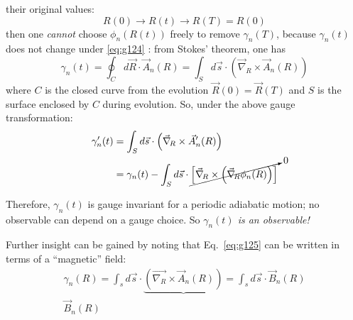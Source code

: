 \documentclass[12pt]{article}
\newcommand{\be}{\begin{equation}}
\newcommand{\ee}{\end{equation}}
\begin{document}
\begin{enumerate}
their original values:
\be
R(0) \rightarrow R(t) \rightarrow R(T)=R(0)
\label{eq:g124}
\ee
then one \emph{cannot} choose $\phi_{n}(R(t))$ freely to
remove $\gamma_{n}(T)$, because $\gamma_{n}(t)$ does not change
under \eqref{eq:g124} : from Stokes' theorem, one has
\be
\gamma_{n}(t)=\oint_{C} d \vec{R} \cdot \vec{A}_{n}(R)=\int_{S} d \vec{s} \cdot\left(\vec{\nabla}_{\!R}  \times \vec{A}_{n}(R)\right)
\label{eq:g125}
\ee
where 
$C$ is the closed curve from the
evolution $\vec{R}(0)=\vec{R}(T)$
and
$S$ is the surface enclosed
by $C$ during evolution.
So, under the above gauge transformation:
\be
\begin{aligned}
\gamma_{n}^{\prime}(t)
&=\int_{S} d \vec{s} \cdot\left(\vec{\nabla}_{\!R}  \times \vec{A}_{n}^{\prime}(R)\right)\\
&=\gamma_{n}(t)-\int_{S} d \vec{s} \cdot
\cancelto{0}{\left[\vec{\nabla}_{\!R}  \times\left(\vec{\nabla}_{\!R}  \phi_{n}(R)\right)\right]}
\end{aligned}
\ee
\end{enumerate}
Therefore, $\gamma_{n}(t)$ is gauge invariant for a
periodic adiabatic motion; no observable can
depend on a gauge choice. So
\emph{$\gamma_n(t)$ is an observable!}

Further insight can be gained by noting that
Eq.~\eqref{eq:g125} can be written in terms of a ``magnetic''
field:
\begin{gather}
\gamma_{n}(R)=\int_{s} d \vec{s} \cdot \underbrace{\left(\vec{\nabla_{\!R}} \times \vec{A}_{n}(R)\right)}=\int_{s} d \vec{s} \cdot \vec{B}_{n}(R)\\
\vec{B}_n(R)
\end{gather}

\setcounter{equation}{143}
\end{document}

